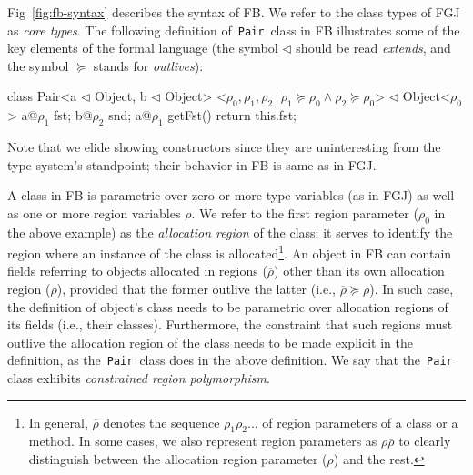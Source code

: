 \documentclass[a4paper,UKenglish]{lipics-v2018}
\newcommand{\C}[1]{\code{#1}}
\newcommand{\code}[1]{\,{\tt #1}\,}
\newcommand{\conj}{\wedge}
\newcommand{\FB}{{\sc FB}\xspace}
\newcommand{\outlives}{\succeq}
\newcommand{\rhobar}{\bar{\rho}}
\newcommand{\extends}{\triangleleft}
\renewcommand{\bar}[1]{\overline{#1}}
\begin{document}
Fig~\ref{fig:fb-syntax} describes the syntax of \FB.
We refer to the class types of FGJ as \emph{core types}.
%
The following definition of \C{Pair} class in \FB illustrates some of
the key elements of the formal language (the symbol $\extends$ should
be read \emph{extends}, and the symbol $\outlives$ stands for
\emph{outlives}):
\begin{codejava}[mathescape=true]
class Pair<a $\extends$ Object, b $\extends$ Object>
          <$\rho_0, \rho_1, \rho_2 \,|\, \rho_1 \outlives \rho_0 \conj
          \rho_2 \outlives \rho_0$> $\extends$ Object<$\rho_0$> {
  a@$\rho_1$ fst; 
  b@$\rho_2$ snd;
  a@$\rho_1$ getFst() { return this.fst; }
}
\end{codejava}
Note that we elide showing constructors since they are uninteresting
from the type system's standpoint; their behavior in \FB is same as in
FGJ. 

A class in \FB is parametric over zero or more type variables (as in
FGJ) as well as one or more region variables $\rho$.  We refer to the
first region parameter ($\rho_0$ in the above example) as the
\emph{allocation region} of the class: it serves to identify the
region where an instance of the class is allocated\footnote{In
general, $\rhobar$ denotes the sequence $\rho_1\rho_2...$ of region
parameters of a class or a method. In some cases, we also represent
region parameters as $\rho\rhobar$ to clearly distinguish between the
allocation region parameter ($\rho$) and the rest.}.
%
An object in \FB can contain fields referring to objects allocated in
regions ($\rhobar$) other than its own allocation region ($\rho$),
provided that the former outlive the latter (i.e., $\rhobar \outlives
\rho$). In such case, the definition of object's class needs to be
parametric over allocation regions of its fields (i.e., their
classes). Furthermore, the constraint that such regions must outlive
the allocation region of the class needs to be made explicit in the
definition, as the \C{Pair} class does in the above definition. We say
that the \C{Pair} class exhibits \emph{constrained region
polymorphism}.
\end{document}
